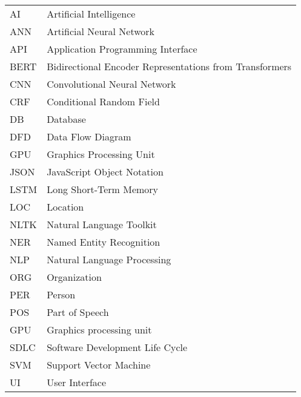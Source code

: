 \begin{tabular}{l@{\hspace{3cm}}p{15cm}}
AI	&	Artificial Intelligence  \\
ANN	&	Artificial Neural Network  \\
API	&	Application Programming Interface  \\
BERT&		Bidirectional Encoder Representations from Transformers  \\
CNN	&	Convolutional Neural Network \\ 
CRF	&	Conditional Random Field \\
DB	&	Database \\
DFD	&	Data Flow Diagram \\
GPU	&	Graphics Processing Unit \\ 
JSON	&	JavaScript Object Notation \\
LSTM	&	Long Short-Term Memory\\
LOC	&	Location \\
NLTK &		Natural Language Toolkit \\
NER	&	Named Entity Recognition \\
NLP	&	Natural Language Processing \\
ORG	&	Organization \\
PER	&	Person \\
POS	&	Part of Speech \\
GPU  & Graphics processing unit		\\
SDLC &		Software Development Life Cycle\\
SVM	&	Support Vector Machine \\
UI	&	User Interface \\



\end{tabular}

